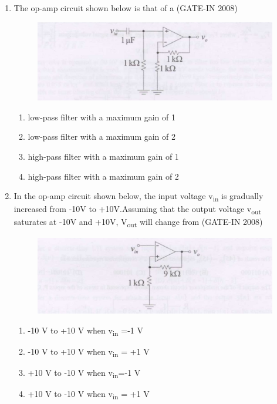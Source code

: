 \documentclass[journal,12pt,onecolumn]{IEEEtran}
\theoremstyle{remark}
\begin{document}
\begin{enumerate}
    \item  The op-amp circuit shown below is that of a (GATE-IN 2008)
    \begin{figure}[H]
    \centering
    \includegraphics[width=0.5\columnwidth]{figs/i19.jpg}
    \caption{}
    \label{fig:placeholder19}
\end{figure}
\begin{multicols}{2}
    \begin{enumerate} 
        \item low-pass filter with a maximum gain of 1 
        \item low-pass filter with a maximum gain of 2
        \item high-pass filter with a maximum gain of 1 
        \item high-pass filter with a maximum gain of 2
    \end{enumerate}
    \end{multicols}
    
    \item In the op-amp circuit shown below, the input voltage v\textsubscript{in} is gradually increased from -10V to +10V.Assuming that the output voltage v\textsubscript{out} saturates at -10V and +10V, V\textsubscript{out} will change from (GATE-IN 2008)
    
    \begin{figure}[H]
    \centering
    \includegraphics[width=0.5\columnwidth]{figs/i20.jpg}
    \caption{}
    \label{fig:placeholder20}
\end{figure}
\begin{multicols}{2}
    \begin{enumerate} 
        \item -10 V to +10 V when v\textsubscript{in} =-1 V
        \item -10 V to +10 V when v\textsubscript{in} = +1 V
        \item +10 V to -10 V when v\textsubscript{in}=-1 V
        \item +10 V to -10 V when v\textsubscript{in} = +1 V
    \end{enumerate}
    \end{multicols}
    

\end{enumerate}
\end{document}
